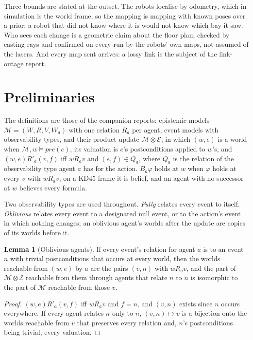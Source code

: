 \documentclass[11pt,a4paper]{article}
\theoremstyle{definition}
\newtheorem{lemma}{Lemma}
\newcommand{\Mod}{\mathcal{M}}
\newcommand{\Ev}{\mathcal{E}}
\newcommand{\prd}{\otimes}
\newcommand{\pre}{\mathit{pre}}
\newcommand{\Bop}[1]{B_{#1}}
\begin{document}
Three bounds are stated at the outset. The robots localise by odometry, which in
simulation is the world frame, so the mapping is mapping with known poses over a
prior; a robot that did not know where it is would not know which bay it saw.
Who sees each change is a geometric claim about the floor plan, checked by
casting rays and confirmed on every run by the robots' own maps, not assumed of
the lasers. And every map sent arrives: a lossy link is the subject of the
link-outage report.

\section{Preliminaries}
\label{sec:prelim}

The definitions are those of the companion reports: epistemic models
$\Mod = (W, R, V, W_d)$ with one relation $R_a$ per agent, event models with
observability types, and their product update $\Mod \prd \Ev$, in which
$(w,e)$ is a world when $\Mod, w \models \pre(e)$, its valuation is $e$'s
postconditions applied to $w$'s, and $(w,e) \mathrel{R'_a} (v,f)$ iff
$w \mathrel{R_a} v$ and $(e,f) \in Q_a$, where $Q_a$ is the relation of the
observability type agent $a$ has for the action. $\Bop{a}\varphi$ holds at $w$
when $\varphi$ holds at every $v$ with $w \mathrel{R_a} v$; on a $\mathrm{KD45}$
frame it is belief, and an agent with no successor at $w$ believes every formula.

Two observability types are used throughout. \emph{Fully} relates every event to
itself. \emph{Oblivious} relates every event to a designated null event, or to
the action's event in which nothing changes; an oblivious agent's worlds after
the update are copies of its worlds before it.

\begin{lemma}[Oblivious agents]
\label{lem:oblivious}
If every event's relation for agent $a$ is to an event $n$ with trivial
postconditions that occurs at every world, then the worlds reachable from
$(w,e)$ by $a$ are the pairs $(v,n)$ with $w \mathrel{R_a} v$, and the part of
$\Mod \prd \Ev$ reachable from them through agents that relate $n$ to $n$ is
isomorphic to the part of $\Mod$ reachable from those $v$.
\end{lemma}

\begin{proof}
$(w,e) \mathrel{R'_a} (v,f)$ iff $w \mathrel{R_a} v$ and $f = n$, and $(v,n)$
exists since $n$ occurs everywhere. If every agent relates $n$ only to $n$,
$(v,n) \mapsto v$ is a bijection onto the worlds reachable from $v$ that
preserves every relation and, $n$'s postconditions being trivial, every
valuation.
\end{proof}
\end{document}
